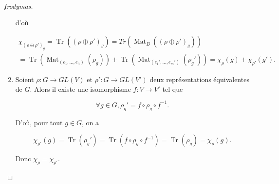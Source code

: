 \documentclass[french]{book}
\theoremstyle{definition}
\theoremstyle{remark}
\begin{document}
\begin{proof}[\k{I}rodymas]
\begin{enumerate}
      d'où

      \begin{gather*}
        \chi _{(\rho\oplus \rho')_g} = \operatorname{Tr}((\rho\oplus \rho')_g) = Tr(\operatorname{Mat}_B((\rho \oplus \rho')_g))\\
         = \operatorname{Tr}(\operatorname{Mat} _{(e_1, \dots, e_n)}(\rho_g))+ \operatorname{Tr}(\operatorname{Mat} _{(e_1', \dots, e_m')}(\rho_g')) = \chi _{\rho}(g) + \chi _{\rho'}(g').
      \end{gather*}

      \item Soient \(\rho : G \longrightarrow GL(V)\) et \(\rho' : G \longrightarrow GL(V')\) deux représentations équivalentes de \(G\). Alors il existe une isomorphisme \(f : V \longrightarrow V'\) tel que

      \[\forall g \in G, \rho_g' = f \circ \rho_g \circ f ^{-1}.\]

      D'où, pour tout \(g \in G\), on a

      \[\chi _{\rho'}(g) = \operatorname{Tr}(\rho_g') = \operatorname{Tr}(f \circ \rho_g \circ f ^{-1}) = \operatorname{Tr}(\rho_g) = \chi _{\rho}(g).\]

      Donc \(\chi _{\rho} = \chi _{\rho'}\).
  \end{enumerate}
\end{proof}

\end{document}
